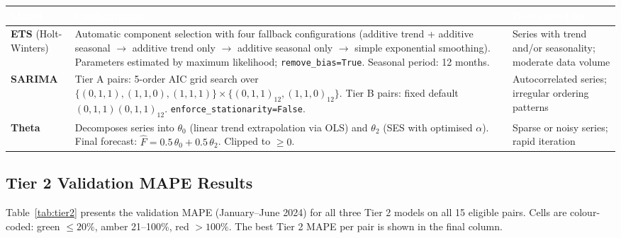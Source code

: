 \documentclass[12pt, a4paper]{article}
\begin{document}
\vspace{0.5em}
\noindent
\begin{tabularx}{\textwidth}{@{} L{3.6cm} X L{2.8cm} @{}}
  \toprule
  \textcolor{white}{\textbf{Model}} &
  \textcolor{white}{\textbf{Configuration}} &
  \textcolor{white}{\textbf{Best suited for}} \\
  \midrule
  \textbf{ETS}
  \newline (Holt-Winters) &
    Automatic component selection with four fallback configurations
    (additive trend + additive seasonal $\to$ additive trend only
    $\to$ additive seasonal only $\to$ simple exponential smoothing).
    Parameters estimated by maximum likelihood; \texttt{remove\_bias=True}.
    Seasonal period: 12 months. &
    Series with trend and/or seasonality; moderate data volume \\
  \textbf{SARIMA} &
    Tier A pairs: 5-order AIC grid search over
    $\{(0,1,1),(1,1,0),(1,1,1)\} \times \{(0,1,1)_{12},(1,1,0)_{12}\}$.
    Tier B pairs: fixed default $(0,1,1)(0,1,1)_{12}$.
    \texttt{enforce\_stationarity=False}. &
    Autocorrelated series; irregular ordering patterns \\
  \textbf{Theta} &
    Decomposes series into $\theta_0$ (linear trend extrapolation via
    OLS) and $\theta_2$ (SES with optimised $\alpha$). Final forecast:
    $\hat{F} = 0.5\,\theta_0 + 0.5\,\theta_2$. Clipped to $\geq 0$. &
    Sparse or noisy series; rapid iteration \\
  \bottomrule
\end{tabularx}

\subsection{Tier 2 Validation MAPE Results}

Table~\ref{tab:tier2} presents the validation MAPE (January--June 2024)
for all three Tier 2 models on all 15 eligible pairs. Cells are
colour-coded: \colorbox{mapeGreen}{green} $\leq 20\%$,
\colorbox{mapeAmber}{amber} 21--100\%, red $> 100\%$.
The best Tier 2 MAPE per pair is shown in the final column.

\vspace{0.6em}
\end{document}
